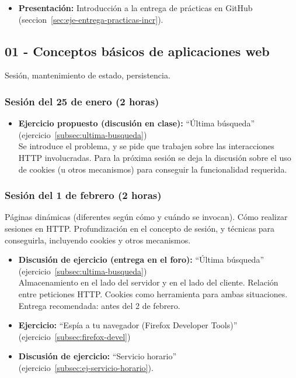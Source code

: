 \documentclass[a4paper,12pt]{article}
\begin{document}
\begin{itemize}
\item \textbf{Presentación:} Introducción a la entrega de prácticas en GitHub (seccion~\ref{sec:eje-entrega-practicas-incr}).
\end{itemize}
  
\subsection{01 - Conceptos básicos de aplicaciones web}

Sesión, mantenimiento de estado, persistencia.

\subsubsection{Sesión del 25 de enero (2 horas)}

\begin{itemize}
\item \textbf{Ejercicio propuesto (discusión en clase):} ``Última búsqueda'' (ejercicio~\ref{subsec:ultima-busqueda}) \\
  Se introduce el problema, y se pide que trabajen sobre las interacciones HTTP involucradas. Para la próxima sesión se deja la discusión sobre el uso de cookies (u otros mecanismos) para conseguir la funcionalidad requerida.
\end{itemize}

\subsubsection{Sesión del 1 de febrero (2 horas)}

Páginas dinámicas (diferentes según cómo y cuándo se invocan). Cómo realizar sesiones en HTTP. Profundización en el concepto de sesión, y técnicas para conseguirla, incluyendo cookies y otros mecanismos.

\begin{itemize}
\item \textbf{Discusión de ejercicio (entrega en el foro):} ``Última búsqueda'' (ejercicio~\ref{subsec:ultima-busqueda}) \\
  Almacenamiento en el lado del servidor y en el lado del cliente. Relación entre peticiones HTTP. Cookies como herramienta para ambas situaciones.\\
  Entrega recomendada: antes del 2 de febrero.
\item \textbf{Ejercicio:} ``Espía a tu navegador (Firefox Developer Tools)'' (ejercicio~\ref{subsec:firefox-devel})
\item \textbf{Discusión de ejercicio:} ``Servicio horario'' \\
  (ejercicio~\ref{subsec:ej-servicio-horario}).
\end{itemize}
\end{document}
